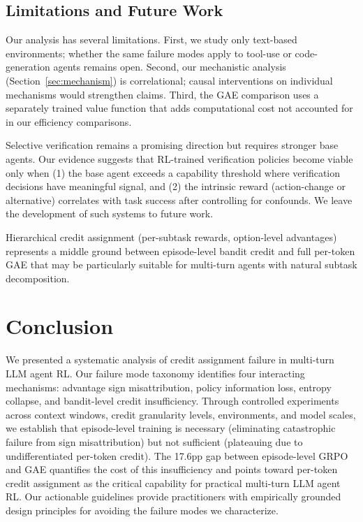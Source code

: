 \documentclass{article}
\begin{document}
\subsection{Limitations and Future Work}

Our analysis has several limitations. First, we study only text-based environments; whether the same failure modes apply to tool-use or code-generation agents remains open. Second, our mechanistic analysis (Section~\ref{sec:mechanism}) is correlational; causal interventions on individual mechanisms would strengthen claims. Third, the GAE comparison uses a separately trained value function that adds computational cost not accounted for in our efficiency comparisons.

Selective verification remains a promising direction but requires stronger base agents. Our evidence suggests that RL-trained verification policies become viable only when (1) the base agent exceeds a capability threshold where verification decisions have meaningful signal, and (2) the intrinsic reward (action-change or alternative) correlates with task success after controlling for confounds. We leave the development of such systems to future work.

Hierarchical credit assignment (per-subtask rewards, option-level advantages) represents a middle ground between episode-level bandit credit and full per-token GAE that may be particularly suitable for multi-turn agents with natural subtask decomposition.

\section{Conclusion}

We presented a systematic analysis of credit assignment failure in multi-turn LLM agent RL. Our failure mode taxonomy identifies four interacting mechanisms: advantage sign misattribution, policy information loss, entropy collapse, and bandit-level credit insufficiency. Through controlled experiments across context windows, credit granularity levels, environments, and model scales, we establish that episode-level training is necessary (eliminating catastrophic failure from sign misattribution) but not sufficient (plateauing due to undifferentiated per-token credit). The 17.6pp gap between episode-level GRPO and GAE quantifies the cost of this insufficiency and points toward per-token credit assignment as the critical capability for practical multi-turn LLM agent RL. Our actionable guidelines provide practitioners with empirically grounded design principles for avoiding the failure modes we characterize.
\end{document}
